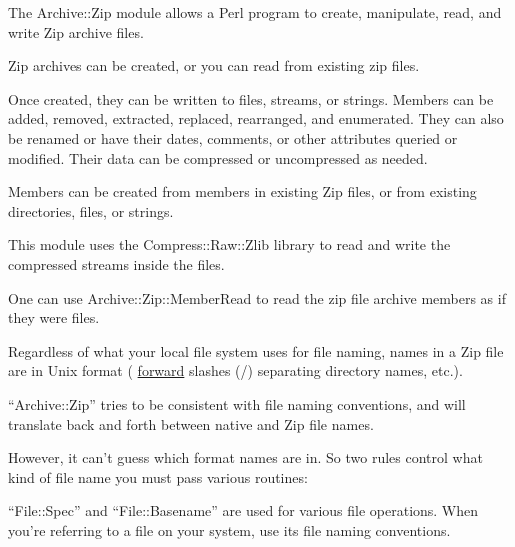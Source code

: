 \documentclass[]{article}
\renewcommand{\emph}[1]{\underline{#1}}
\begin{document}

The Archive::Zip module allows a Perl program to create, manipulate,
read, and write Zip archive files.

Zip archives can be created, or you can read from existing zip files.

Once created, they can be written to files, streams, or strings. Members
can be added, removed, extracted, replaced, rearranged, and enumerated.
They can also be renamed or have their dates, comments, or other
attributes queried or modified. Their data can be compressed or
uncompressed as needed.

Members can be created from members in existing Zip files, or from
existing directories, files, or strings.

This module uses the Compress::Raw::Zlib library to read and write the
compressed streams inside the files.

One can use Archive::Zip::MemberRead to read the zip file archive
members as if they were files.


Regardless of what your local file system uses for file naming, names in
a Zip file are in Unix format ( \emph{forward} slashes (/) separating
directory names, etc.).

``Archive::Zip'' tries to be consistent with file naming conventions,
and will translate back and forth between native and Zip file names.

However, it can't guess which format names are in. So two rules control
what kind of file name you must pass various routines:

\begin{description}
\itemsep1pt\parskip0pt
\item[Names of files are in local format.]
``File::Spec'' and ``File::Basename'' are used for various file
operations. When you're referring to a file on your system, use its file
naming conventions.
\end{description}
\end{document}
